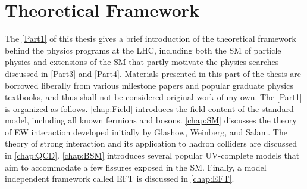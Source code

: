 \part{Theoretical Framework}
\label{Part1}
The \autoref{Part1} of this thesis gives a brief introduction of the theoretical framework behind the physics programs at the \ac{LHC}, including both the \ac{SM} of particle physics and extensions of the \ac{SM} that partly motivate the physics searches discussed in \autoref{Part3} and \autoref{Part4}. Materials presented in this part of the thesis are borrowed liberally from various milestone papers and popular graduate physics textbooks, and thus shall not be considered original work of my own. The \autoref{Part1} is organized as follows. \autoref{chap:Field} introduces the field content of the standard model, including all known fermions and bosons. \autoref{chap:SM} discusses the theory of \ac{EW} interaction developed initially by Glashow, Weinberg, and Salam. The theory of strong interaction and its application to hadron colliders are discussed in \autoref{chap:QCD}. \autoref{chap:BSM} introduces several popular \ac{UV}-complete models that aim to accommodate a few fissures exposed in the \ac{SM}. Finally, a model independent framework called \ac{EFT} is discussed in \autoref{chap:EFT}.






